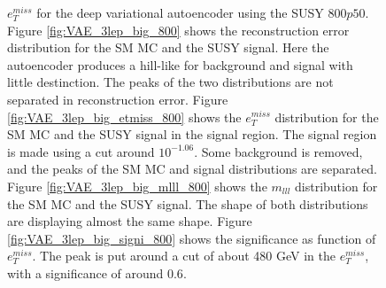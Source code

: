 \begin{figure}[h!]
{    $e_T^{miss}$ for the deep variational autoencoder using the SUSY $800p50$.
    Figure \ref{fig:VAE_3lep_big_800} shows the reconstruction error 
    distribution for the SM MC and the SUSY signal. Here the autoencoder produces a hill-like for background and 
    signal with little destinction. The peaks of the two distributions are not separated in reconstruction error. Figure \ref{fig:VAE_3lep_big_etmiss_800} 
    shows the $e_T^{miss}$ distribution for the SM MC and the SUSY signal in the signal region. 
    The signal region is made using a cut around $10^{-1.06}$. Some background is removed, and the peaks of the SM MC and signal 
    distributions are separated. Figure \ref{fig:VAE_3lep_big_mlll_800} shows the $m_{lll}$ distribution for the SM MC and the SUSY signal. 
    The shape of both distributions are displaying almost the same shape. Figure \ref{fig:VAE_3lep_big_signi_800} shows the significance as 
    function of $e_T^{miss}$. The peak is put around a cut of about 480 GeV in the $e_T^{miss}$, with a significance of around $0.6$.}
    \label{fig:VAE_3lep_big_rec_sig_signi_800}
\end{figure}

